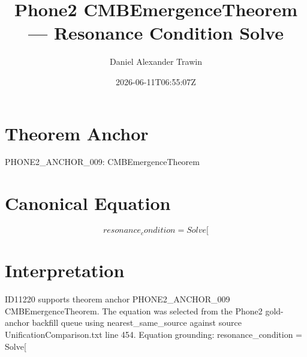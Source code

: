\documentclass[11pt]{article}
\title{Phone2 CMBEmergenceTheorem — Resonance Condition Solve}
\author{Daniel Alexander Trawin}
\date{2026-06-11T06:55:07Z}
\begin{document}
\maketitle
\section*{Theorem Anchor}
PHONE2_ANCHOR_009: CMBEmergenceTheorem
\section*{Canonical Equation}
\[
resonance_condition = Solve[
\]
\section*{Interpretation}
ID11220 supports theorem anchor PHONE2_ANCHOR_009 CMBEmergenceTheorem. The equation was selected from the Phone2 gold-anchor backfill queue using nearest_same_source against source UnificationComparison.txt line 454. Equation grounding: resonance_condition = Solve[
\end{document}
